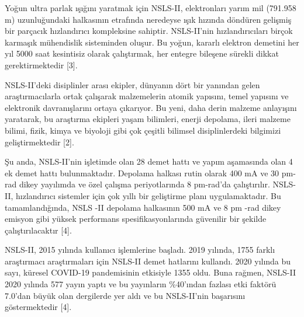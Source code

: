 \documentclass{article}
\begin{document}
Yoğun ultra parlak ışığını yaratmak için NSLS-II, elektronları yarım mil (791.958 m) uzunluğundaki halkasının etrafında neredeyse ışık hızında döndüren gelişmiş bir parçacık hızlandırıcı kompleksine sahiptir. NSLS-II'nin hızlandırıcıları birçok karmaşık mühendislik sisteminden oluşur. Bu yoğun, kararlı elektron demetini her yıl 5000 saat kesintisiz olarak çalıştırmak, her entegre bileşene sürekli dikkat gerektirmektedir [3].

NSLS-II'deki disiplinler arası ekipler, dünyanın dört bir yanından gelen araştırmacılarla ortak çalışarak malzemelerin atomik yapısını, temel yapısını ve elektronik davranışlarını ortaya çıkarıyor. Bu yeni, daha derin malzeme anlayışını yaratarak, bu araştırma ekipleri yaşam bilimleri, enerji depolama, ileri malzeme bilimi, fizik, kimya ve biyoloji gibi çok çeşitli bilimsel disiplinlerdeki bilgimizi geliştirmektedir [2].

Şu anda, NSLS-II'nin işletimde olan 28 demet hattı ve yapım aşamasında olan 4 ek demet hattı bulunmaktadır. Depolama halkası rutin olarak 400 mA ve 30 pm-rad dikey yayılımda ve özel çalışma periyotlarında 8 pm-rad'da çalıştırılır. NSLS-II, hızlandırıcı sistemler için çok yıllı bir geliştirme planı uygulamaktadır. Bu tamamlandığında, NSLS -II depolama halkasının 500 mA ve 8 pm -rad dikey emisyon gibi yüksek performans spesifikasyonlarında güvenilir bir şekilde çalıştırılacaktır [4].

NSLS-II, 2015 yılında kullanıcı işlemlerine başladı. 2019 yılında, 1755 farklı araştırmacı araştırmaları için NSLS-II demet hatlarını kullandı. 2020 yılında bu sayı, küresel COVID-19 pandemisinin etkisiyle 1355 oldu. Buna rağmen, NSLS-II 2020 yılında 577 yayın yaptı ve bu yayınların \%40'ından fazlası etki faktörü 7.0'dan büyük olan dergilerde yer aldı ve bu NSLS-II'nin başarısını göstermektedir [4].
\end{document}
